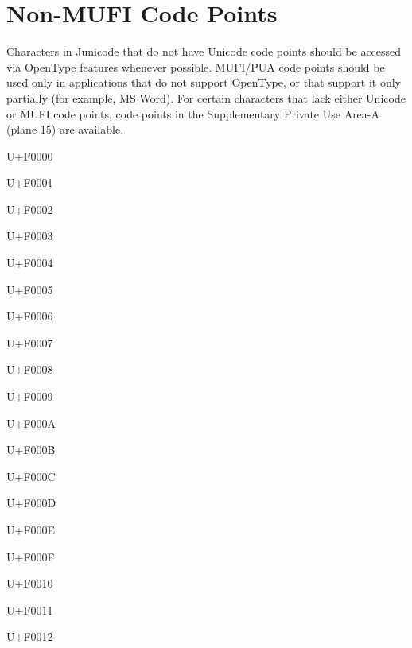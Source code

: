 \chapter{Non-MUFI Code Points}\hypertarget{nonmufi}{}

Characters in Junicode that do not have Unicode code points should be accessed via OpenType
features whenever possible. MUFI/PUA code points should be used only in applications that do not support OpenType, or
that support it only partially (for example, MS Word). For certain characters that lack either Unicode or MUFI code
points, code points in the Supplementary Private Use Area-A (plane 15) are available.

\begin{multicols}{4}
{\color[rgb]{0.13333334,0.29411766,0.07058824}
U+F0000 }

{\color[rgb]{0.13333334,0.29411766,0.07058824}
U+F0001 󰀁}

{\color[rgb]{0.13333334,0.29411766,0.07058824}
U+F0002 󰀂}

{\color[rgb]{0.13333334,0.29411766,0.07058824}
U+F0003 󰀃}

{\color[rgb]{0.13333334,0.29411766,0.07058824}
U+F0004 󰀄}

{\color[rgb]{0.13333334,0.29411766,0.07058824}
U+F0005 󰀅}

{\color[rgb]{0.13333334,0.29411766,0.07058824}
U+F0006 󰀆}

{\color[rgb]{0.13333334,0.29411766,0.07058824}
U+F0007 󰀇}

{\color[rgb]{0.13333334,0.29411766,0.07058824}
U+F0008 󰀈}

{\color[rgb]{0.13333334,0.29411766,0.07058824}
U+F0009 󰀉}

{\color[rgb]{0.13333334,0.29411766,0.07058824}
U+F000A 󰀊}

{\color[rgb]{0.13333334,0.29411766,0.07058824}
U+F000B 󰀋}

{\color[rgb]{0.13333334,0.29411766,0.07058824}
U+F000C 󰀌}

{\color[rgb]{0.13333334,0.29411766,0.07058824}
U+F000D 󰀍}

{\color[rgb]{0.13333334,0.29411766,0.07058824}
U+F000E 󰀎}

{\color[rgb]{0.13333334,0.29411766,0.07058824}
U+F000F 󰀏}

{\color[rgb]{0.13333334,0.29411766,0.07058824}
U+F0010 󰀐}

{\color[rgb]{0.13333334,0.29411766,0.07058824}
U+F0011 󰀑}

{\color[rgb]{0.13333334,0.29411766,0.07058824}
U+F0012 󰀒}


\end{multicols}
